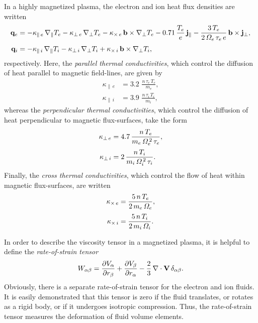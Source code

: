 \documentclass[notitlepage,12pt]{article}
\begin{document}
In a highly magnetized plasma, the electron and ion heat flux densities are written 
\begin{align}
{\bf q}_e &= -\kappa_{\parallel\,e}\,\nabla_\parallel T_e -\kappa_{\perp\,e}\,
\nabla_\perp T_e
-\kappa_{\times\,e}\,{\bf b}\times\nabla_\perp T_e- 0.71\,\frac{T_e}{e}\,{\bf j}_\parallel-
\frac{3\,T_e}{2\,{\mit\Omega}_e\,\tau_e\,e}\,{\bf b}\times{\bf j}_\perp,\label{e3.94a}\\[0.5ex]
{\bf q}_i &= -\kappa_{\parallel\,i}\,\nabla_\parallel T_i -\kappa_{\perp\,i}\,
\nabla_\perp T_i
+\kappa_{\times\,i}\,{\bf b}\times\nabla_\perp T_i,\label{e3.94b}
\end{align}
respectively. Here, the {\em parallel thermal conductivities}, which control the diffusion of heat parallel to magnetic field-lines, are 
given by
\begin{align}\label{e3.87a}
\kappa_{\parallel\,e} &= 3.2\,\,\frac{n\,\tau_e\,T_e}{m_e},\\[0.5ex]
\kappa_{\parallel\,i} &= 3.9\,\,\frac{n\,\tau_i\,T_i}{m_i},\label{e3.87b}
\end{align} 
whereas the {\em perpendicular thermal conductivities}, which control the diffusion of heat perpendicular to magnetic flux-surfaces, take the form
\begin{align}
\kappa_{\perp\,e} &= 4.7\,\frac{n\,T_e}{m_e\,{\mit\Omega}_e^{\,2}\,\tau_e},\\[0.5ex]
\kappa_{\perp\,i} &= 2\, \frac{n\,T_i}{m_i\,{\mit\Omega}_i^{\,2}\,\tau_i}.
\end{align}
Finally, the {\em cross thermal conductivities}, which control the flow of heat within magnetic flux-surfaces,  are written
\begin{align}
\kappa_{\times\,e} &= \frac{5\,n\,T_e}{2\,m_e\,{\mit\Omega}_e},\\[0.5ex]
\kappa_{\times\,i} &=\frac{5\,n\,T_i}{2\,m_i\,{\mit\Omega}_i}.
\end{align}

In order to describe the viscosity tensor in a magnetized plasma, it is
helpful to define the {\em rate-of-strain tensor}  
\begin{equation}
W_{\alpha\beta} = \frac{\partial V_\alpha}{\partial r_\beta}
+ \frac{\partial V_\beta}{\partial r_\alpha} - \frac{2}{3} \,\nabla\cdot{\bf V}\,
\delta_{\alpha\beta}.
\end{equation}
Obviously, there is a separate rate-of-strain tensor for the electron and ion
fluids. It is easily demonstrated that this tensor is zero if the fluid
translates, or rotates as a rigid body, or if it undergoes isotropic
compression. Thus, the rate-of-strain tensor measures the  deformation  of
fluid volume elements. 
\end{document}
